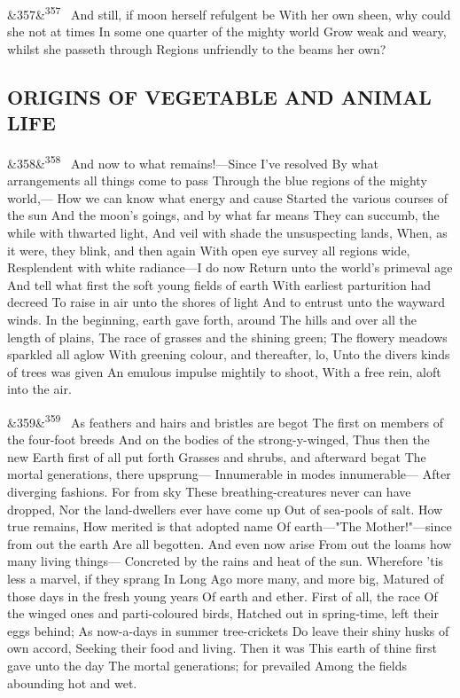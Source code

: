 \documentclass[12pt]{article}
\newcommand{\para}[1][]{\par\noindent\ifx&#1&\else\textsuperscript{\footnotesize #1}~\fi}
\begin{document}
\para[357] And still, if moon herself refulgent be With her own sheen, why could she not at times In some one quarter of the mighty world Grow weak and weary, whilst she passeth through Regions unfriendly to the beams her own?

\subsection*{ORIGINS OF VEGETABLE AND ANIMAL LIFE}

\para[358] And now to what remains!---Since I've resolved By what arrangements all things come to pass Through the blue regions of the mighty world,--- How we can know what energy and cause Started the various courses of the sun And the moon's goings, and by what far means They can succumb, the while with thwarted light, And veil with shade the unsuspecting lands, When, as it were, they blink, and then again With open eye survey all regions wide, Resplendent with white radiance---I do now Return unto the world's primeval age And tell what first the soft young fields of earth With earliest parturition had decreed To raise in air unto the shores of light And to entrust unto the wayward winds. In the beginning, earth gave forth, around The hills and over all the length of plains, The race of grasses and the shining green; The flowery meadows sparkled all aglow With greening colour, and thereafter, lo, Unto the divers kinds of trees was given An emulous impulse mightily to shoot, With a free rein, aloft into the air.

\para[359] As feathers and hairs and bristles are begot The first on members of the four-foot breeds And on the bodies of the strong-y-winged, Thus then the new Earth first of all put forth Grasses and shrubs, and afterward begat The mortal generations, there upsprung--- Innumerable in modes innumerable--- After diverging fashions. For from sky These breathing-creatures never can have dropped, Nor the land-dwellers ever have come up Out of sea-pools of salt. How true remains, How merited is that adopted name Of earth---"The Mother!"---since from out the earth Are all begotten. And even now arise From out the loams how many living things--- Concreted by the rains and heat of the sun. Wherefore 'tis less a marvel, if they sprang In Long Ago more many, and more big, Matured of those days in the fresh young years Of earth and ether. First of all, the race Of the winged ones and parti-coloured birds, Hatched out in spring-time, left their eggs behind; As now-a-days in summer tree-crickets Do leave their shiny husks of own accord, Seeking their food and living. Then it was This earth of thine first gave unto the day The mortal generations; for prevailed Among the fields abounding hot and wet.
\end{document}
